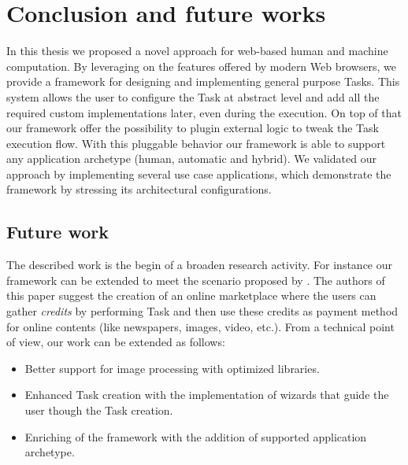 \chapter{Conclusion and future works}
\label{cap:conclusion}

In this thesis we proposed a novel approach for web-based human and machine
computation. By leveraging on the features offered by modern Web browsers,
we provide a framework for designing and implementing general purpose Tasks.
This system allows the user to configure the Task at abstract level and add
all the required custom implementations later, even during the execution.
On top of that our framework offer the possibility to plugin external
logic to tweak the Task execution flow. With this pluggable behavior our framework
is able to support any application archetype (human, automatic and hybrid).
We validated our approach by implementing several use case applications, which demonstrate the framework by stressing its architectural configurations. 

\section{Future work}
The described work is the begin of a broaden research activity. For instance our 
framework can be extended to meet the scenario proposed by \cite{karame2011pay}.
The authors of this paper suggest the creation of an online marketplace where
the users can gather \emph{credits} by performing Task and then use these credits
as payment method for online contents (like newspapers, images, video, etc.).
From a technical point of view, our work can be extended as follows:
\begin{itemize}
    \item Better support for image processing with optimized libraries.
    \item Enhanced Task creation with the implementation of wizards that guide
    the user though the Task creation.
    \item Enriching of the framework with the addition of supported application
    archetype.
\end{itemize}